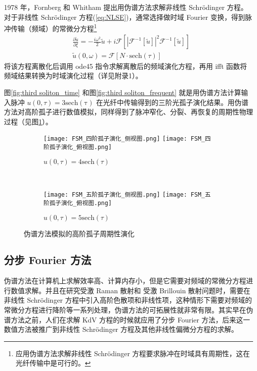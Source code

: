 1978 年，Fornberg 和 Whitham 提出用伪谱方法求解非线性
Schrödinger 方程\cite{Fornberg}。对于非线性 Schr\"odinger 方程(\ref{eq:NLSE})，通常选择做时域 Fourier 变换，得到脉冲传输（频域）的常微分方程\footnote{应用伪谱方法求解非线性 Schr\"odinger 方程要求脉冲在时域具有周期性，这在光纤传输中是可行的。}
\begin{align}
    &\frac{\partial \widetilde{u}}{\partial \xi}=-\frac{i\omega^2}{2}\widetilde{u}+i\mathscr{F}\left[\left|\mathscr{F}^{-1}[\widetilde{u}]\right|^2\mathscr{F}^{-1}[\widetilde{u}]\right]\\
    &\widetilde{u}(0,\omega)=\mathscr{F}\left[N\cdot\mathrm{sech}(\tau)\right]
\end{align}
将该方程离散化后调用 ode45 指令求解离散后的频域演化方程，再用 ifft 函数将频域结果转换为时域演化过程（详见附录1）。

图\ref{fig:third soliton_time} 和图\ref{fig:third soliton_frequent} 就是用伪谱方法计算输入脉冲 $u(0,\tau)=3\mathrm{sech(\tau)}$ 在光纤中传输得到的三阶光孤子演化结果。用伪谱方法对高阶孤子进行数值模拟，同样得到了脉冲窄化、分裂、再恢复的周期性物理过程（见图\ref{fig:Fourier spectral method}）。
\begin{figure}[tbp]
    \centering
    \begin{subfigure}[t]{0.85\linewidth}
        \captionsetup{justification=centering} 
        \begin{minipage}[b]{1\linewidth}
        \texttt{[image: FSM\_四阶孤子演化\_侧视图.png]}
        \texttt{[image: FSM\_四阶孤子演化\_俯视图.png]}
        \caption{$u(0,\tau)=4\mathrm{sech}(\tau)$}
        \end{minipage}
    \end{subfigure}\\
    \begin{subfigure}[t]{0.85\linewidth}
        \captionsetup{justification=centering} 
        \begin{minipage}[b]{1\linewidth}
        \texttt{[image: FSM\_五阶孤子演化\_侧视图.png]}
        \texttt{[image: FSM\_五阶孤子演化\_俯视图.png]}
        \caption{$u(0,\tau)=5\mathrm{sech}(\tau)$}
        \end{minipage}
    \end{subfigure}
    \caption{伪谱方法模拟的高阶孤子周期性演化}
    \label{fig:Fourier spectral method}
\end{figure}
\subsection{分步 Fourier 方法}
伪谱方法在计算机上求解效率高、计算内存小，但是它需要对频域的常微分方程进行数值求解。并且在研究受激 Raman 散射和 受激 Brillouin 散射问题时，需要在非线性 Schr\"odinger 方程中引入高阶色散项和非线性项，这种情形下需要对频域的常微分方程进行降阶等一系列处理，伪谱方法的可拓展性就非常有限。其实早在伪谱方法之前，人们在求解 KdV 方程的时候就应用了分步 Fourier 方法\cite{Tappert,Chellappan}，后来这一数值方法被推广到非线性 Schr\"odinger 方程及其他非线性偏微分方程的求解。
